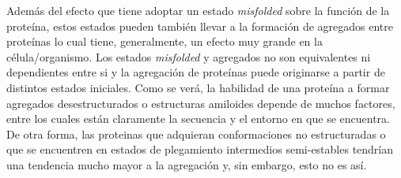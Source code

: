 Además del efecto que tiene adoptar un estado \textit{misfolded} sobre la función de la proteína, estos estados pueden también llevar a la formación de agregados entre proteínas
lo cual tiene, generalmente, un efecto muy grande en la célula/organismo.
Los estados \textit{misfolded} y agregados no son equivalentes ni dependientes entre si y 
la agregación de proteínas puede originarse a partir de distintos estados iniciales. 
Como se verá, la habilidad de una proteína a formar agregados desestructurados o estructuras amiloides depende de muchos factores, entre los cuales están claramente la secuencia y el entorno en que se encuentra.
De otra forma, las proteinas que adquieran conformaciones no estructuradas o que se encuentren en estados de plegamiento intermedios semi-estables tendrían una tendencia mucho mayor a la agregación y, sin embargo, esto no es así. 








